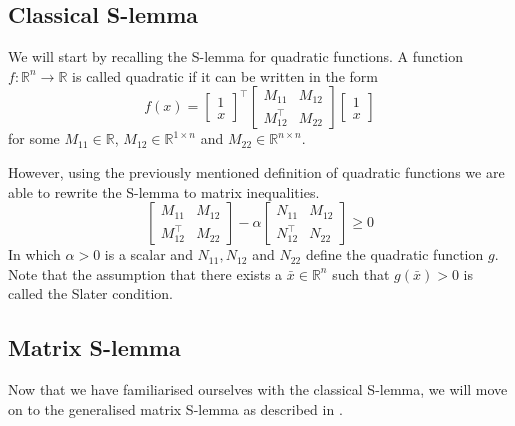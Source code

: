 \subsection{Classical S-lemma}
We will start by recalling the S-lemma for quadratic functions. A function $f : \mathbb{R}^n \to \mathbb{R}$ is called quadratic if it can be written in the form
\[ f(x) = \begin{bmatrix} 1\\x \end{bmatrix}^\top
\begin{bmatrix} M_{11}&M_{12}\\M_{12}^\top&M_{22} \end{bmatrix}
\begin{bmatrix} 1\\x \end{bmatrix} \]
for some $M_{11}\in\mathbb{R}$, $M_{12}\in\mathbb{R}^{1\times n}$ and $M_{22} \in \mathbb{R}^{n \times n}$.

However, using the previously mentioned definition of quadratic functions we are able to rewrite the S-lemma to matrix inequalities.
\[ \begin{bmatrix} M_{11}&M_{12}\\M_{12}^\top&M_{22} \end{bmatrix} - \alpha \begin{bmatrix} N_{11}&M_{12}\\N_{12}^\top&N_{22} \end{bmatrix} \geq 0 \]
In which $\alpha > 0$ is a scalar and $N_{11},N_{12}$ and $N_{22}$ define the quadratic function $g$. Note that the assumption that there exists a $\bar{x} \in \mathbb{R}^n$ such that $g(\bar{x}) > 0$ is called the Slater condition.



\subsection{Matrix S-lemma}
Now that we have familiarised ourselves with the classical S-lemma, we will move on to the generalised matrix S-lemma as described in \cite[Theorem 9]{waarde2020noisy}.

